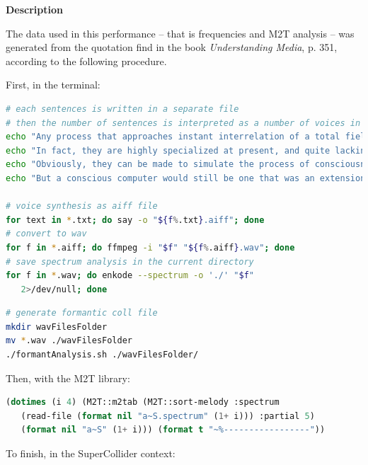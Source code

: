\documentclass{book}
\begin{document}
\smallskip
\bigskip

\noindent \textbf{{\large Description}}
\hrulefill

\bigskip

The data used in this performance -- that is frequencies and M2T analysis --  was generated from the quotation find in the book \textit{Understanding Media}, \citep{mm} p. 351, according to the following procedure.

\newpage

First, in the terminal:

\begin{lstlisting}[language=bash]
# each sentences is written in a separate file
# then the number of sentences is interpreted as a number of voices in order to make interesting combination done with ~OCWR and symmetric permutation
echo "Any process that approaches instant interrelation of a total field tends to raise itself to the level of conscious awareness, so that computers seem to think." > 1.txt
echo "In fact, they are highly specialized at present, and quite lacking in the full process of interrelation that makes for consciousness." > 2.txt
echo "Obviously, they can be made to simulate the process of consciousness, just as our electric global networks now begin to simulate the condition of our central nervous system." > 3.txt
echo "But a conscious computer would still be one that was an extension of our consciousness." > 4.txt

# voice synthesis as aiff file 
for text in *.txt; do say -o "${f%.txt}.aiff"; done
# convert to wav 
for f in *.aiff; do ffmpeg -i "$f" "${f%.aiff}.wav"; done
# save spectrum analysis in the current directory
for f in *.wav; do enkode --spectrum -o './' "$f" 
   2>/dev/null; done
\end{lstlisting}
\begin{lstlisting}[language=bash]
# generate formantic coll file
mkdir wavFilesFolder
mv *.wav ./wavFilesFolder
./formantAnalysis.sh ./wavFilesFolder/
\end{lstlisting}

Then, with the M2T library:

 \begin{lstlisting}[basicstyle=\footnotesize\ttfamily,language=Lisp]
(dotimes (i 4) (M2T::m2tab (M2T::sort-melody :spectrum 
   (read-file (format nil "a~S.spectrum" (1+ i))) :partial 5) 
   (format nil "a~S" (1+ i))) (format t "~%-----------------"))
\end{lstlisting}

To finish, in the SuperCollider context:
\end{document}
